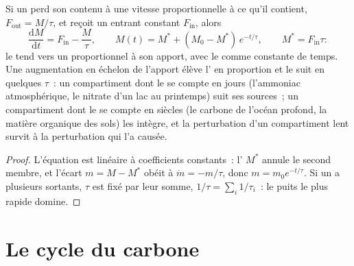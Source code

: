\begin{theorem}\label{thm:b2:biogeochemical-cycles:box}
Si un  perd son contenu à une vitesse proportionnelle à ce qu'il
contient, $F_{\text{out}} = M/\tau$, et reçoit un  entrant constant
$F_{\text{in}}$, alors
\[
\frac{\mathrm{d}M}{\mathrm{d}t} = F_{\text{in}} - \frac{M}{\tau},
\qquad
M(t) = M^{*} + (M_0 - M^{*})\,e^{-t/\tau}, \qquad M^{*} = F_{\text{in}}\tau :
\]
le  tend vers un  proportionnel à son apport,
avec le  comme constante de temps. Une augmentation en
échelon de l'apport élève l' en proportion et le
 suit en quelques $\tau$~: un compartiment dont le  se compte en jours (l'ammoniac atmosphérique, le nitrate d'un
lac au printemps) suit ses sources~; un compartiment dont le  se compte en siècles (le carbone de l'océan profond, la matière
organique des sols) les intègre, et la perturbation d'un compartiment
lent survit à la perturbation qui l'a causée.
\end{theorem}
\begin{proof}
L'équation est linéaire à coefficients constants~: l'
$M^{*}$ annule le second membre, et l'écart $m = M - M^{*}$
obéit à $\dot m = -m/\tau$, donc $m = m_0 e^{-t/\tau}$. Si un 
a plusieurs  sortants, $\tau$ est fixé par leur somme, $1/\tau = \sum_i
1/\tau_i$~: le puits le plus rapide domine.
\end{proof}

\section{Le cycle du carbone}

